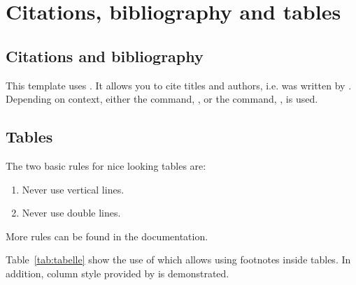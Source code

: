 \cleardoublepage
\chapter{Citations, bibliography and tables}\label{ch:conclusion}

\section{Citations and bibliography}
This template uses . It allows you to cite titles and authors, i.e.  was written by \citeauthor{freierMobileQuantumGravity2016}. Depending on context, either the  command, \textcite{schkolnikEffectWavefrontAberrations2015}, or the  command, \parencite{schkolnikEffectWavefrontAberrations2015}, is used.


\section{Tables}
The two basic rules for nice looking tables are:
\begin{enumerate}
    \item Never use vertical lines.
    \item Never use double lines.
\end{enumerate}
More rules can be found in the  documentation.


Table \,\ref{tab:tabelle} show the use of  which allows using footnotes inside tables. In addition, column style provided by  is demonstrated.

